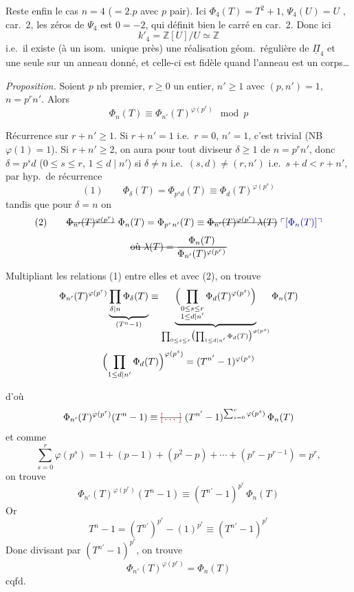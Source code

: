 \documentclass[11pt,a4paper]{article}
\begin{document}
Reste enfin le cas $n = 4$ ($= 2.p$ avec $p$ pair). Ici $\Phi_4(T) = T^2 + 1$, $\Psi_4(U) = U$ ,  car.\ 2, les  zéros de $\Psi_4$ est $0 = -2$,  qui définit bien le carré en car.\ 2. Donc ici
\[
  k'_4 = \mathbb{Z}[U] / U \simeq \mathbb{Z}
\]
i.e.\ il existe (à un isom.\ unique près) une réalisation géom.\ régulière de $\underline{\Pi}_4$ et une seule sur un anneau \uncertain{\ill{}} donné, et celle-ci est \struck{\ill{}} fidèle quand l'anneau est un corps…

\emph{Proposition.} Soient $p$ nb premier, $r \geq 0$ un entier, $n' \geq 1$ avec $(p, n') = 1$, $n = p^r n'$. Alors \ill{}
\[
  \Phi_n(T) \equiv \Phi_{n'}(T)^{\varphi(p^r)} \mod p
\]

Récurrence sur $r + n' \geq 1$. Si $r + n' = 1$ i.e.\ $r = 0$, $n' = 1$, c'est trivial (NB $\varphi(1) = 1$). Si $r + n' \geq 2$, on aura pour tout diviseur $\delta \geq 1$ de $n = p^r n'$, donc $\delta = p^s d$ ($0 \leq s \leq r$, $1 \leq d \mid n'$) si $\delta \neq n$ i.e.\ $(s, d) \neq (r, n')$ i.e.\ $s + d < r + n'$, par hyp.\ de récurrence
\[
  (1) \qquad \Phi_\delta(T) = \Phi_{p^s d}(T) \equiv \Phi_d(T)^{\varphi(p^s)}
\]
tandis que pour $\delta = n$ on 
\[
  (2) \qquad \text{\struck{$\Phi_{n'}(T)^{\varphi(p^r)}$}}\ \Phi_n(T) = \Phi_{p^r n'}(T) \equiv \text{\struck{$\Phi_{n'}(T)^{\varphi(p^r)}\, \lambda(T)$}}\ \text{\add{$[\Phi_n(T)]$}}
\]
\[
  \text{\struck{où $\lambda(T) = \dfrac{\Phi_n(T)}{\Phi_{n'}(T)^{\varphi(p^r)}}$}}
\]

Multipliant les relations (1) entre elles et avec (2), on trouve
\[
  \Phi_{n'}(T)^{\varphi(p^r)} \underbrace{\prod_{\delta \mid n} \Phi_\delta(T)}_{(T^n - 1)}
  \equiv
  \underbrace{\Bigl(\prod_{\substack{0 \leq s \leq r\\ 1 \leq d \mid n'}} \Phi_d(T)^{\varphi(p^s)}\Bigr)}_{\prod_{0 \leq s \leq r} \bigl(\prod_{1 \leq d \mid n'} \Phi_d(T)\bigr)^{\varphi(p^s)}} \Phi_n(T)
\]
\[
  \Bigl(\prod_{1 \leq d \mid n'} \Phi_d(T)\Bigr)^{\varphi(p^s)} = (T^{n'} - 1)^{\varphi(p^s)}
\]

d'où
\[
  \Phi_{n'}(T)^{\varphi(p^r)} (T^n - 1) \equiv \text{\struck{\ill{}}}\ (T^{n'} - 1)^{\sum_{s=0}^{r} \varphi(p^s)}\, \Phi_n(T)
\]
et comme
\[
  \sum_{s=0}^{r} \varphi(p^s) = 1 + (p - 1) + (p^2 - p) + \cdots + (p^r - p^{r-1}) = p^r,
\]
on trouve
\[
  \Phi_{n'}(T)^{\varphi(p^r)} (T^n - 1) \equiv (T^{n'} - 1)^{p^r}\, \Phi_n(T)
\]
Or
\[
  T^n - 1 = (T^{n'})^{p^r} - (1)^{p^r} \equiv (T^{n'} - 1)^{p^r}
\]
\struck{\ill{}} Donc divisant par $(T^{n'} - 1)^{p^r}$, on trouve
\[
  \Phi_{n'}(T)^{\varphi(p^r)} = \Phi_n(T)
\]
cqfd.
\end{document}

